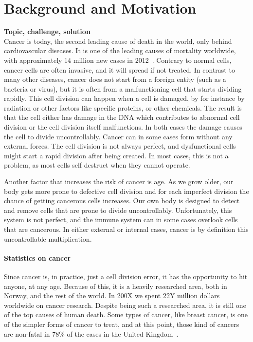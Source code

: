 \section{Background and Motivation}

\textbf{Topic, challenge, solution}\\
Cancer is today, the second leading cause of death in the world, only behind cardiovascular diseases.  %
It is one of the leading causes of mortality worldwide, with approximately 14 million new cases in 2012~\cite{WHOCANCER}.
Contrary to normal cells, cancer cells are often invasive, and it will spread if not treated. 
In contrast to many other diseases, cancer does not start from a foreign entity (such as a bacteria or virus), but it is often from a malfunctioning cell that starts dividing rapidly. 
This cell division can happen when a cell is damaged, by for instance by radiation or other factors like specific proteins, or other chemicals. The result is that the cell either has damage in the DNA which contributes to abnormal cell division or the cell division itself malfunctions. In both cases the damage causes the cell to divide uncontrollably. 
Cancer can in some cases form without any external forces. The cell division is not always perfect, and dysfunctional cells might start a rapid division after being created. In most cases, this is not a problem, as most cells self destruct when they cannot operate. 

Another factor that increases the risk of cancer is age. As we grow older, our body gets more prone to defective cell division and for each imperfect division the chance of getting cancerous cells increases.  
Our own body is designed to detect and remove cells that are prone to divide uncontrollably. Unfortunately, this system is not perfect, and the immune system can in some cases overlook cells that are cancerous.
In either external or internal cases, cancer is by definition this uncontrollable multiplication.




\paragraph{Statistics on cancer}
Since cancer is, in practice, just a cell division error, it has the opportunity to hit anyone, at any age. Because of this, it is a heavily researched area, both in Norway, and the rest of the world.
In 200X we spent 22Y million dollars worldwide on cancer research. 
Despite being such a researched area, it is still one of the top causes of human death. 
Some types of cancer, like breast cancer, is one of the simpler forms of cancer to treat, and at this point, those kind of cancers are non-fatal in 78\% of the cases in the United Kingdom~\cite{UKCancer}. 
    
